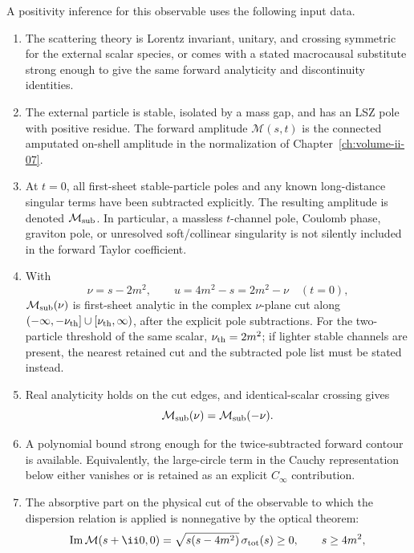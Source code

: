\begin{hypothesis}
\label{hyp:forward-scalar-positivity-ledger}
A positivity inference for this observable uses the following input data.
\begin{enumerate}
  \item The scattering theory is Lorentz invariant, unitary, and crossing
  symmetric for the external scalar species, or comes with a stated
  macrocausal substitute strong enough to give the same forward analyticity and
  discontinuity identities.
  \item The external particle is stable, isolated by a mass gap, and has an LSZ
  pole with positive residue.  The forward amplitude
  \(\mathcal M(s,t)\) is the connected amputated on-shell amplitude in the
  normalization of Chapter~\ref{ch:volume-ii-07}.
  \item At \(t=0\), all first-sheet stable-particle poles and any known
  long-distance singular terms have been subtracted explicitly.  The resulting
  amplitude is denoted
  \(\mathcal M_{\rm sub}\).  In particular, a massless \(t\)-channel pole,
  Coulomb phase, graviton pole, or unresolved soft/collinear singularity is not
  silently included in the forward Taylor coefficient.
  \item With
  \[
    \nu=s-2m^2,
    \qquad
    u=4m^2-s=2m^2-\nu
    \quad (t=0),
  \]
  \(\mathcal M_{\rm sub}(\nu)\) is first-sheet analytic in the complex
  \(\nu\)-plane cut along
  \((-\infty,-\nu_{\rm th}]\cup[\nu_{\rm th},\infty)\), after the explicit pole
  subtractions.  For the two-particle threshold of the same scalar,
  \(\nu_{\rm th}=2m^2\); if lighter stable channels are present, the nearest
  retained cut and the subtracted pole list must be stated instead.
  \item Real analyticity holds on the cut edges, and identical-scalar crossing
  gives
  \[
    \mathcal M_{\rm sub}(\nu)=\mathcal M_{\rm sub}(-\nu).
  \]
  \item A polynomial bound strong enough for the twice-subtracted forward
  contour is available.  Equivalently, the large-circle term in the Cauchy
  representation below either vanishes or is retained as an explicit
  \(C_\infty\) contribution.
  \item The absorptive part on the physical cut of the observable to which the
  dispersion relation is applied is nonnegative by the optical theorem:
  \[
    \operatorname{Im}\mathcal M(s+\ii0,0)
    =
    \sqrt{s(s-4m^2)}\,\sigma_{\rm tot}(s)
    \ge0 ,
    \qquad s\ge4m^2 ,
\]
\end{enumerate}
\end{hypothesis}
